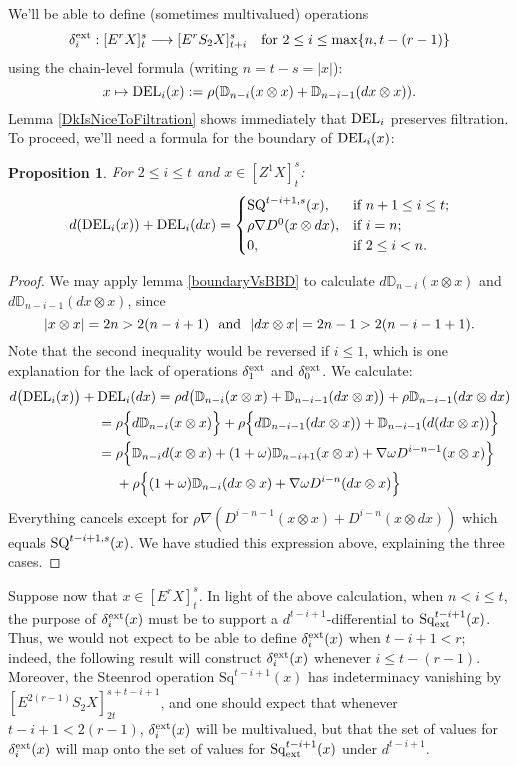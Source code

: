 \documentclass[11pt]{amsart}
\theoremstyle{plain}
\newtheorem{prop}[thm]{Proposition}
\theoremstyle{definition}
\renewcommand{\to}{\longrightarrow}
\theoremstyle{plain}
\newcommand{\twist}{\omega}
\newcommand{\Nabla}{\nabla}
\newcommand{\Sq}{\mathrm{Sq}}
\newcommand{\E}[5]{[E^{#1}_{#2}#3]^{#4}_{#5}}
\newcommand{\EZ}[5]{[Z^{#1}_{#2}#3]^{#4}_{#5}}
\begin{document}
\begin{second quadrant homotopy}
We'll be able to define (sometimes multivalued) operations
\[\delta^\textup{ext}_i:\E{r}{}{X}{s}{t}\to \E{r}{}{S_2X}{s}{t+i}\textup{\ \ \ for $2\leq i\leq\max\{n,t-(r-1)\}$}\]
using the chain-level formula (writing $n=t-s=|x|$):
\[x\mapsto \textup{DEL}_{i}(x):=\rho(\mathbb{D}_{n-i}(x\otimes x)+\mathbb{D}_{n-i-1}(dx\otimes x)).\]
Lemma \ref{DkIsNiceToFiltration} shows immediately that $\textup{DEL}_i$ preserves filtration.
To proceed, we'll need a formula for the boundary of $\textup{DEL}_i(x)$:
\begin{prop}
\label{dvsDEL}
For $2\leq i\leq t$ and $x\in \EZ{1}{}{X}{s}{t}$:
\[d(\textup{DEL}_i(x))+ \textup{DEL}_i(dx)=\begin{cases}
\textup{SQ}^{t-i+1,s}(x),&\textup{if }n+1\leq i \leq t;\\
\rho\Nabla D^0(x\otimes dx),&\textup{if }i=n;\\
0,&\textup{if }2\leq i< n.
\end{cases}\]
\end{prop}
\begin{proof}
We may apply lemma \ref{boundaryVsBBD} to calculate $d\mathbb{D}_{n-i}(x\otimes x)$ and $d\mathbb{D}_{n-i-1}(dx\otimes x)$, since 
\[|x\otimes x|=2n> 2(n-i+1)\textup{ \ and \ }|dx\otimes x|=2n-1> 2(n-i-1+1).\]
Note that the second inequality would be reversed if $i\leq1$, which is one explanation for the lack of operations $\delta^\textup{ext}_1$ and $\delta^\textup{ext}_0$. We calculate:
\begin{alignat*}{2}
d\bigl(\textup{DEL}_i(x)\bigr)+{}& \textup{DEL}_i(dx)
=
\rho d\bigl(\mathbb{D}_{n-i}(x\otimes x)+\mathbb{D}_{n-i-1}(dx\otimes x)\bigr)+\rho\mathbb{D}_{n-i-1}(dx\otimes dx)%
\\
&=
\rho\Bigl\{d\mathbb{D}_{n-i}(x\otimes x)\Bigr\}+\rho\Bigl\{d\mathbb{D}_{n-i-1}(dx\otimes x))+\mathbb{D}_{n-i-1}(d(dx\otimes x))\Bigr\}%
\\
&=
\rho\Bigl\{\mathbb{D}_{n-i}d(x\otimes x)+(1+\twist)\mathbb{D}_{n-i+1}(x\otimes x)+\Nabla\twist D^{i-n-1}(x\otimes x)\Bigr\}
\\
&\ \ \ \ +\rho\Bigl\{(1+\twist)\mathbb{D}_{n-i}(dx\otimes x)+\Nabla\twist D^{i-n}(dx\otimes x)\Bigr\}
\end{alignat*}
Everything cancels except for $\rho\Nabla(D^{i-n-1}(x\otimes x)+D^{i-n}(x\otimes dx))$ which equals $\textup{SQ}^{t-i+1,s}(x)$. We have studied this expression above, explaining the three cases.
\end{proof}
Suppose now that $x\in \E{r}{}{X}{s}{t}$. In light of the above calculation, when $n<i\leq t$, the purpose of $\delta^\textup{ext}_i(x)$ must be to support a $d^{t-i+1}$-differential to $\Sq_\textup{ext}^{t-i+1}(x)$. Thus, we would not expect to be able to define $\delta^\textup{ext}_i(x)$ when $t-i+1<r$; indeed, the following result will construct $\delta^\textup{ext}_i(x)$ whenever $i\leq t-(r-1)$. Moreover, the Steenrod operation $\Sq^{t-i+1}(x)$ has indeterminacy vanishing by $\E{2(r-1)}{}{S_2X}{s+t-i+1}{2t}$, and one should expect that whenever $t-i+1<2(r-1)$, $\delta^\textup{ext}_i(x)$ will be multivalued, but that the set of values for $\delta^\textup{ext}_i(x)$ will map onto the set of values for $\Sq_\textup{ext}^{t-i+1}(x)$ under $d^{t-i+1}$. 

\end{second quadrant homotopy}
\end{document}
